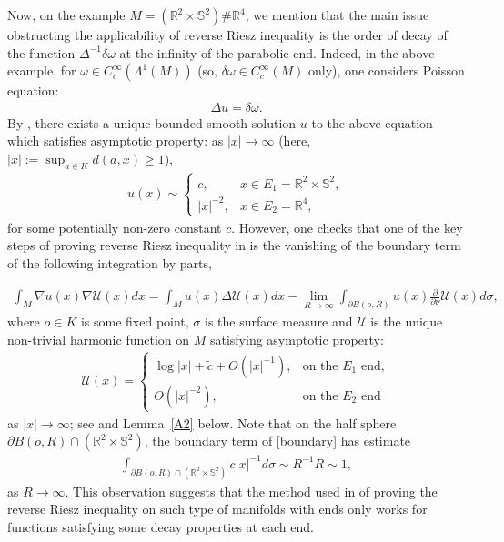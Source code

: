 \documentclass[12pt]{amsart}
\begin{document}
Now, on the example $M=(\mathbb{R}^2 \times \mathbb{S}^{2}) \# \mathbb{R}^4$, we mention that the main issue obstructing the applicability of reverse Riesz inequality is the order of decay of the function $\Delta^{-1}\delta \omega$ at the infinity of the parabolic end. Indeed, in the above example, for $\omega \in C_c^\infty(\Lambda^1(M))$ (so, $\delta \omega \in C_c^\infty(M)$ only), one considers Poisson equation:
\begin{align*}
    \Delta u = \delta \omega.
\end{align*}
By \cite[Lemma~2.9]{HNS}, there exists a unique bounded smooth solution $u$ to the above equation which satisfies asymptotic property: as $|x|\to \infty$ (here, $|x|:= \sup_{a\in K}d(a,x) \ge 1$),
\begin{align*}
    u(x) \sim \begin{cases}
        c, & x\in E_1 = \mathbb{R}^2 \times \mathbb{S}^2,\\
        |x|^{-2}, & x\in E_2 = \mathbb{R}^{4},
    \end{cases}
\end{align*}
for some potentially non-zero constant $c$. However, one checks that one of the key steps of proving reverse Riesz inequality in \cite[Page 9, above equation (3.6)]{He2} is the vanishing of the boundary term of the following integration by parts, 

\begin{align}\label{boundary}
    \int_M \nabla u(x) \nabla \mathcal{U}(x) dx = \int_M u(x) \Delta \mathcal{U}(x) dx - \lim_{R\to \infty} \int_{\partial B(o,R)} u(x) \frac{\partial}{\partial \nu} \mathcal{U}(x) d\sigma,
\end{align}
where $o\in K$ is some fixed point, $\sigma$ is the surface measure and  $\mathcal{U}$ is the unique non-trivial harmonic function on $M$ satisfying asymptotic property:
\begin{align*}
    \mathcal{U}(x) = \begin{cases}
        \log{|x|} + \tilde{c} + O(|x|^{-1}), & \textrm{on the $E_1$ end},\\
        O(|x|^{-2}), & \textrm{on the $E_2$ end}
    \end{cases}
\end{align*}
as $|x|\to \infty$; see \cite[Lemma~2.10]{HNS} and Lemma~\ref{A2} below. Note that on the half sphere $\partial B(o,R) \cap (\mathbb{R}^2 \times \mathbb{S}^2)$, the boundary term of \eqref{boundary} has estimate
\begin{align*}
    \int_{ \partial B(o,R) \cap (\mathbb{R}^2 \times \mathbb{S}^2)} c |x|^{-1} d\sigma \sim R^{-1} R \sim 1,
\end{align*}
as $R\to \infty$. This observation suggests that the method used in \cite{He2} of proving the reverse Riesz inequality on such type of manifolds with ends only works for functions satisfying some decay properties at each end.
\end{document}
